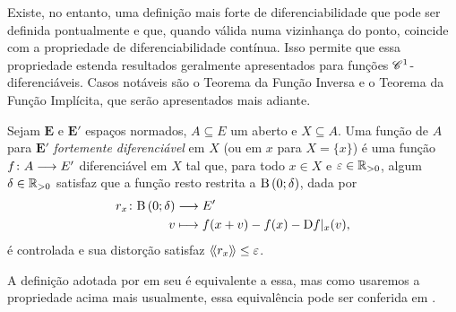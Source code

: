 Existe, no entanto, uma definição mais forte de diferenciabilidade que pode ser definida pontualmente e que, quando válida numa vizinhança do ponto, coincide com a propriedade de diferenciabilidade contínua. Isso permite que essa propriedade estenda resultados geralmente apresentados para funções $\mathscr{C}^1$-diferenciáveis. Casos notáveis são o Teorema da Função Inversa e o Teorema da Função Implícita, que serão apresentados mais adiante.

\begin{definition}
Sejam $\bm E$ e $\bm E'$ espaços normados, $A \subseteq E$ um aberto e $X \subseteq A$. Uma função de $A$ para $\bm E'$ \emph{fortemente diferenciável} em $X$ (ou em $x$ para $X = \{x\}$) é uma função $f\colon \allowbreak A \longrightarrow E'$ diferenciável em $X$ tal que, para todo $x \in X$ e $\varepsilon \in \mathbb{R}_{>0}$, algum $\delta \in \mathbb{R}_{>0}$ satisfaz que a função resto restrita a $\mathrm{B}\left(0; \delta\right)$, dada por
	\begin{align*}
	{r_x}\colon {\mathrm{B}\left(0; \delta\right)} &\longrightarrow {E'} \\{v} &\longmapsto f(x+v) - f(x) - \mathrm{D} f|_x(v),
	\end{align*}
é controlada e sua distorção satisfaz $\langle\!\langle{r_x}\rangle\!\rangle \leq \varepsilon$.
\end{definition}

A definição adotada por \citeauthor{liv:Lima-CursoAnalise2} em seu  é equivalente a essa, mas como usaremos a propriedade acima mais usualmente, essa equivalência %
pode ser conferida em \cite[p. 279]{liv:Lima-CursoAnalise2}.



